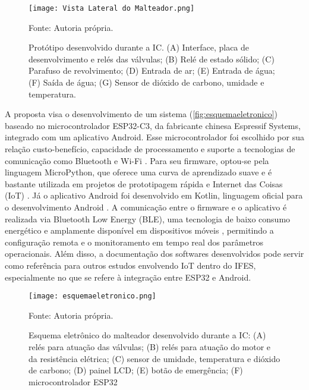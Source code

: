 \begin{figure}[ht]
    \centering
    \caption{Protótipo desenvolvido durante a IC. (A) Interface, placa de desenvolvimento e relés das válvulas; (B) Relé de estado sólido; (C) Parafuso de revolvimento; (D) Entrada de ar; (E) Entrada de água; (F) Saída de água; (G) Sensor de dióxido de carbono, umidade e temperatura.}  
    \label{fig:malteador}
    \texttt{[image: Vista Lateral do Malteador.png]}

    {\centering\footnotesize Fonte: Autoria própria.\par}
\end{figure}

A proposta visa o desenvolvimento de um sistema (\autoref{fig:esquemaeletronico}) baseado no microcontrolador ESP32-C3, da fabricante chinesa Espressif Systems, integrado com um aplicativo Android. Esse microcontrolador foi escolhido por sua relação custo-benefício, capacidade de processamento e suporte a tecnologias de comunicação como Bluetooth e Wi-Fi \cite{rodrigues2021controle, santos2019sistema}. Para seu firmware, optou-se pela linguagem MicroPython, que oferece uma curva de aprendizado suave e é bastante utilizada em projetos de prototipagem rápida e Internet das Coisas (IoT) \cite{TOLLERVEY2017, brito2020automaccao}. Já o aplicativo Android foi desenvolvido em Kotlin, linguagem oficial para o desenvolvimento Android \cite{sempreupdate_kotlin_2020}. A comunicação entre o firmware e o aplicativo é realizada via Bluetooth Low Energy (BLE), uma tecnologia de baixo consumo energético e amplamente disponível em dispositivos móveis \cite{heydon2012bluetooth}, permitindo a configuração remota e o monitoramento em tempo real dos parâmetros operacionais. Além disso, a documentação dos softwares desenvolvidos pode servir como referência para outros estudos envolvendo IoT dentro do IFES, especialmente no que se refere à integração entre ESP32 e Android.

\begin{figure}[ht]
    \centering
    \caption{Esquema eletrônico do malteador desenvolvido durante a IC: (A) relés para atuação das válvulas; (B) relés para atuação do motor e da resistência elétrica; (C) sensor de umidade, temperatura e dióxido de carbono; (D) painel LCD; (E) botão de emergência; (F) microcontrolador ESP32}
    \label{fig:esquemaeletronico}
    \texttt{[image: esquemaeletronico.png]}

    {\centering\footnotesize Fonte: Autoria própria.\par}
\end{figure}


